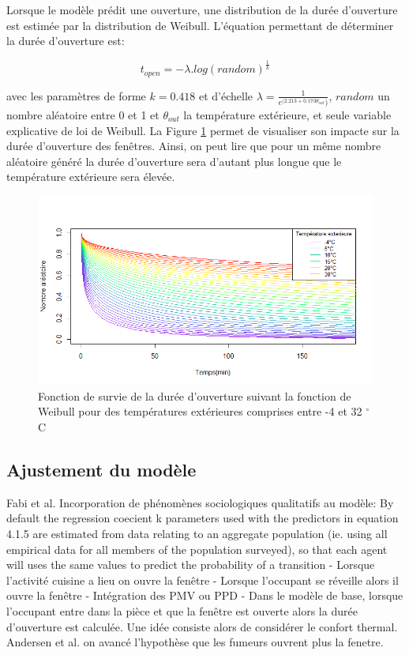 Lorsque le modèle prédit une ouverture, une distribution de la durée d'ouverture est estimée par la distribution de Weibull. L'équation permettant de déterminer la durée d'ouverture est:

\begin{equation}
t_{open}=-\lambda.log(random)^{\frac{1}{k}}
\label{distWeibull}
\end{equation}

avec les paramètres de forme $k=0.418$ et d'échelle $\lambda=\frac{1}{e^{(2.213+0.173\theta_{out}})}$, $random$ un nombre aléatoire entre 0 et 1 et $\theta_{out}$ la température extérieure, et seule variable explicative de loi de Weibull. La Figure \ref{fig:WeibullTest} permet de visualiser son impacte sur la durée d'ouverture des fenêtres. Ainsi, on peut lire que pour un même nombre aléatoire généré la durée d'ouverture sera d'autant plus longue que le température extérieure sera élevée.

\begin{figure}[H]
\centering
\includegraphics[scale=0.6]{Images/Fenetre/WeibullTest}
\caption{Fonction de survie de la durée d'ouverture suivant la fonction de Weibull pour des températures extérieures comprises entre -4 et 32 $^{\circ}$ C}
\label{fig:WeibullTest}
\end{figure}

\subsection{Ajustement du modèle}

 Fabi et al. \cite{Fabi-12}
Incorporation de phénomènes sociologiques qualitatifs au modèle:
By default the regression coecient k parameters used with the
predictors in equation 4.1.5 are estimated from data relating to an aggregate population (ie.
using all empirical data for all members of the population surveyed), so that each agent will
uses the same values to predict the probability of a transition
    - Lorsque l'activité cuisine a lieu on ouvre la fenêtre
    - Lorsque l'occupant se réveille alors il ouvre la fenêtre
    - Intégration des PMV ou PPD
    - Dans le modèle de base, lorsque l'occupant entre dans la pièce et que la fenêtre est ouverte alors la durée d'ouverture est calculée. Une idée consiste alors de considérer le confort thermal.
Andersen et al. \cite{Andersen-13} on avancé l'hypothèse que les fumeurs ouvrent plus la fenetre.
    
